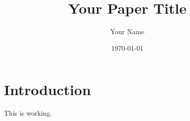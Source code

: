 \documentclass{article}
\title{Your Paper Title}
\author{Your Name}
\date{\today}
\begin{document}
\maketitle

\section{Introduction}
This is working.
\end{document}
